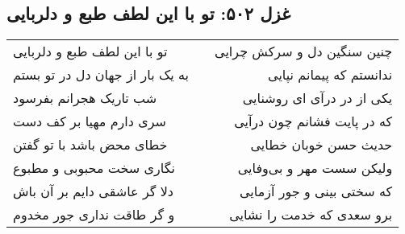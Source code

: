 \begin{center}
\section*{غزل ۵۰۲: تو با این لطف طبع و دلربایی}
\label{sec:502}
\begin{longtable}{l p{0.5cm} r}
تو با این لطف طبع و دلربایی
&&
چنین سنگین دل و سرکش چرایی
\\
به یک بار از جهان دل در تو بستم
&&
ندانستم که پیمانم نپایی
\\
شب تاریک هجرانم بفرسود
&&
یکی از در درآی ای روشنایی
\\
سری دارم مهیا بر کف دست
&&
که در پایت فشانم چون درآیی
\\
خطای محض باشد با تو گفتن
&&
حدیث حسن خوبان خطایی
\\
نگاری سخت محبوبی و مطبوع
&&
ولیکن سست مهر و بی‌وفایی
\\
دلا گر عاشقی دایم بر آن باش
&&
که سختی بینی و جور آزمایی
\\
و گر طاقت نداری جور مخدوم
&&
برو سعدی که خدمت را نشایی
\\
\end{longtable}
\end{center}
